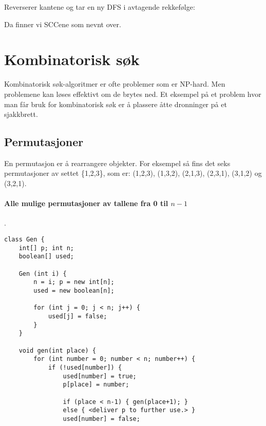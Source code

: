 \documentclass[11pt,a4paper]{article}
\theoremstyle{def}
\begin{document}
Reverserer kantene og tar en ny DFS i avtagende rekkefølge:


Da finner vi SCCene som nevnt over.

\newpage

\section{Kombinatorisk søk}
Kombinatorisk søk-algoritmer er ofte problemer som er NP-hard. Men problemene kan løses effektivt om de brytes ned. Et eksempel på et problem hvor man får bruk for kombinatorisk søk er å plassere åtte dronninger på et sjakkbrett. 
\vspace{-10pt}
\subsection{Permutasjoner}

En permutasjon er å rearrangere objekter. For eksempel så fins det seks permutasjoner av settet \{1,2,3\}, som er: (1,2,3), (1,3,2), (2,1,3), (2,3,1), (3,1,2) og (3,2,1).
\vspace{-20pt}
\paragraph{Alle mulige permutasjoner av tallene fra 0 til $n-1$}.
\begin{lstlisting}[frame=none]
class Gen {
	int[] p; int n;
	boolean[] used;
	
	Gen (int i) {
		n = i; p = new int[n];
		used = new boolean[n];
	
		for (int j = 0; j < n; j++) {
			used[j] = false;
		}
	}

	void gen(int place) {
		for (int number = 0; number < n; number++) {
			if (!used[number]) {
				used[number] = true;
				p[place] = number;
				
				if (place < n-1) { gen(place+1); }
				else { <deliver p to further use.> }
				used[number] = false;
\end{lstlisting}
\vspace{-30pt}
\end{document}
